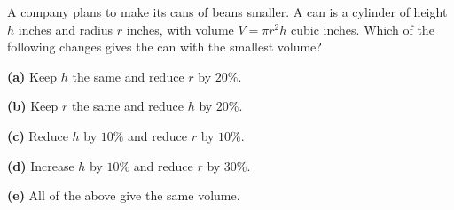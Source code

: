 A company plans to make its cans of beans smaller. A can is a cylinder of height $h$ inches and radius $r$ inches, with volume $V=\pi r^2h$ cubic inches. Which of the following changes gives the can with the smallest volume?

\textbf{(a)} Keep $h$ the same and reduce $r$ by $20\%$.

\textbf{(b)} Keep $r$ the same and reduce $h$ by $20\%$.

\textbf{(c)} Reduce $h$ by $10\%$ and reduce $r$ by $10\%$.

\textbf{(d)} Increase $h$ by $10\%$ and reduce $r$ by $30\%$.

\textbf{(e)} All of the above give the same volume.
